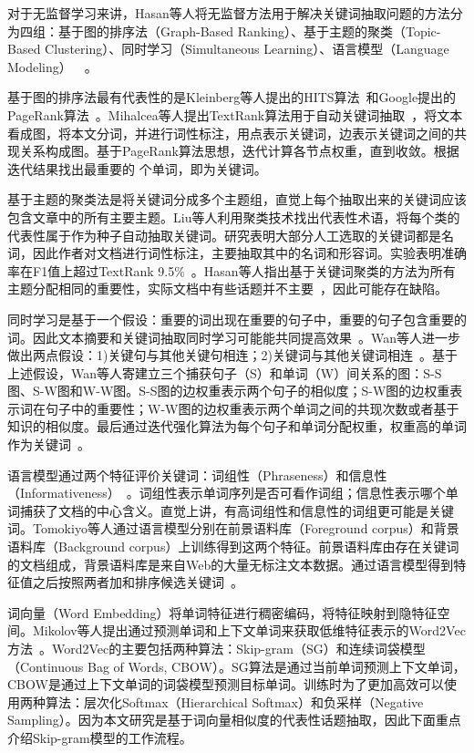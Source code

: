 对于无监督学习来讲，Hasan等人将无监督方法用于解决关键词抽取问题的方法分为四组：基于图的排序法（Graph-Based Ranking）、基于主题的聚类（Topic-Based Clustering）、同时学习（Simultaneous Learning）、语言模型（Language Modeling）~~。

基于图的排序法最有代表性的是Kleinberg等人提出的HITS算法~和Google提出的PageRank算法~。Mihalcea等人提出TextRank算法用于自动关键词抽取~，将文本看成图，将本文分词，并进行词性标注，用点表示关键词，边表示关键词之间的共现关系构成图。基于PageRank算法思想，迭代计算各节点权重，直到收敛。根据迭代结果找出最重要的 个单词，即为关键词。

基于主题的聚类法是将关键词分成多个主题组，直觉上每个抽取出来的关键词应该包含文章中的所有主要主题。Liu等人利用聚类技术找出代表性术语，将每个类的代表性属于作为种子自动抽取关键词。研究表明大部分人工选取的关键词都是名词，因此作者对文档进行词性标注，主要抽取其中的名词和形容词。实验表明准确率在F1值上超过TextRank 9.5\%~。Hasan等人指出基于关键词聚类的方法为所有主题分配相同的重要性，实际文档中有些话题并不主要~，因此可能存在缺陷。

同时学习是基于一个假设：重要的词出现在重要的句子中，重要的句子包含重要的词。因此文本摘要和关键词抽取同时学习可能能共同提高效果~。Wan等人进一步做出两点假设：1)关键句与其他关键句相连；2)关键词与其他关键词相连~。基于上述假设，Wan等人寄建立三个捕获句子（S）和单词（W）间关系的图：S-S图、S-W图和W-W图。S-S图的边权重表示两个句子的相似度；S-W图的边权重表示词在句子中的重要性；W-W图的边权重表示两个单词之间的共现次数或者基于知识的相似度。最后通过迭代强化算法为每个句子和单词分配权重，权重高的单词作为关键词~。

语言模型通过两个特征评价关键词：词组性（Phraseness）和信息性（Informativeness）~。词组性表示单词序列是否可看作词组；信息性表示哪个单词捕获了文档的中心含义。直觉上讲，有高词组性和信息性的词组更可能是关键词。Tomokiyo等人通过语言模型分别在前景语料库（Foreground corpus）和背景语料库（Background corpus）上训练得到这两个特征。前景语料库由存在关键词的文档组成，背景语料库是来自Web的大量无标注文本数据。通过语言模型得到特征值之后按照两者加和排序候选关键词~。

词向量（Word Embedding）将单词特征进行稠密编码，将特征映射到隐特征空间。Mikolov等人提出通过预测单词和上下文单词来获取低维特征表示的Word2Vec方法~。Word2Vec的主要包括两种算法：Skip-gram（SG）和连续词袋模型（Continuous Bag of Words, CBOW）。SG算法是通过当前单词预测上下文单词，CBOW是通过上下文单词的词袋模型预测目标单词。训练时为了更加高效可以使用两种算法：层次化Softmax（Hierarchical Softmax）和负采样（Negative Sampling）。因为本文研究是基于词向量相似度的代表性话题抽取，因此下面重点介绍Skip-gram模型的工作流程。

